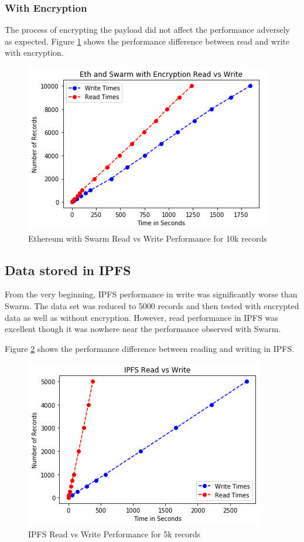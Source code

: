 \documentclass[11pt,openright]{report}
\begin{document}
\subsubsection{With Encryption}
The process of encrypting the payload did not affect the performance adversely as expected. Figure \ref{fig:graph_eth_swarm_encr_readvwrite} shows the performance difference between read and write with encryption.

\begin{figure}
    \centering
    \includegraphics[scale=1]{results/graphs/Eth_Swarm_Read_v_Write_Encr.png}
    \caption{Ethereum with Swarm Read vs Write Performance for 10k records}
    \label{fig:graph_eth_swarm_encr_readvwrite}
\end{figure}

\subsection{Data stored in IPFS}
From the very beginning, IPFS performance in write was significantly worse than Swarm. The data set was reduced to 5000 records and then tested with encrypted data as well as without encryption. However, read performance in IPFS was excellent though it was nowhere near the performance observed with Swarm.

Figure \ref{fig:graph_ipfs_readvwrite} shows the performance difference between reading and writing in IPFS.

\begin{figure}
    \centering
    \includegraphics[scale=1]{results/graphs/IPFS_Read_v_Write.png}
    \caption{IPFS Read vs Write Performance for 5k records}
    \label{fig:graph_ipfs_readvwrite}
\end{figure}
\end{document}
